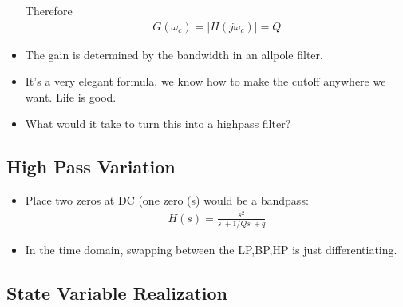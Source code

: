 \begin{itemize}
{Therefore
\begin{align*}
G(\omega_c) = \vert H(j\omega_c) \vert = Q
\end{align*}

}
\item{
The gain is determined by the bandwidth in an allpole filter. 
}
\item{
It's a very elegant formula, we know how to make the cutoff anywhere we want. 
Life is good.
}
\item{
What would it take to turn this into a highpass filter?
}
\end{itemize}
\subsection*{High Pass Variation}
\begin{itemize}
\item{
Place two zeros at DC (one zero (s) would be a bandpass:
\begin{align*}
H(s) = \frac{s^2}{s ~ + 1/Qs ~ + q}
\end{align*}
}
\item{
In the time domain, swapping between the LP,BP,HP is just differentiating. 
}
\end{itemize}

\subsection*{State Variable Realization}

